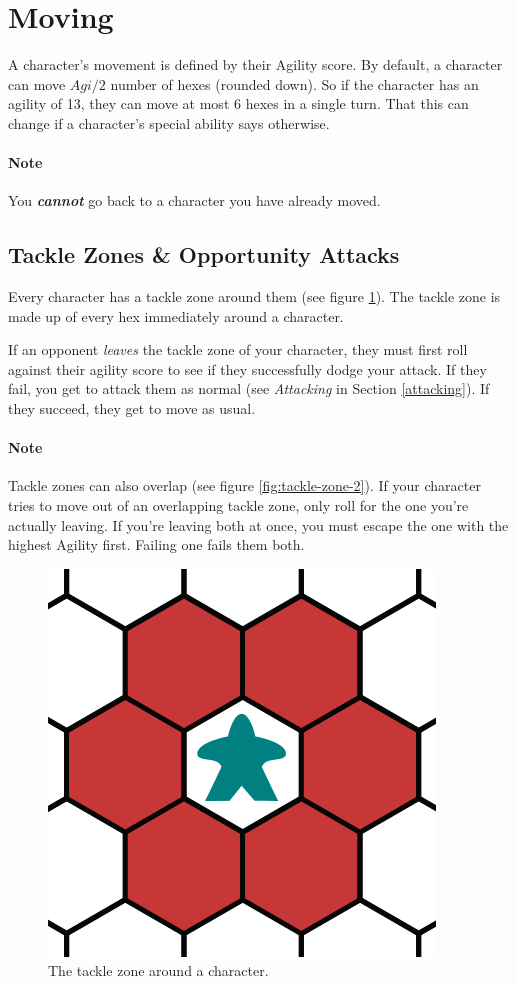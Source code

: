 \section{Moving} \label{moving}
A character's movement is defined by their Agility score. 
By default, a character can move $Agi / 2$ number of hexes (rounded down). 
So if the character has an agility of 13, they can move at most 6 hexes in a single turn. That this can change if a character's special ability says otherwise.

\paragraph{Note} You \textit{\textbf{cannot}} go back to a character you have already moved.

\subsection{Tackle Zones \& Opportunity Attacks}
Every character has a tackle zone around them (see figure \ref{fig:tackle-zone-1}).
The tackle zone is made up of every hex immediately around a character.

If an opponent \textit{leaves} the tackle zone of your character, they must first roll against their agility score to see if they successfully dodge your attack.
If they fail, you get to attack them as normal (see \textit{Attacking} in Section \ref{attacking}). If they succeed, they get to move as usual.

\paragraph{Note} Tackle zones can also overlap (see figure \ref{fig:tackle-zone-2}). If your character tries to move out of an overlapping tackle zone, only roll for the one you're actually leaving. If you're leaving both at once, you must escape the one with the highest Agility first. Failing one fails them both.

\begin{figure}
    \centering
    \includegraphics{tackle-zones-1.png}
    \caption{The tackle zone around a character.}
    \label{fig:tackle-zone-1}
\end{figure}

